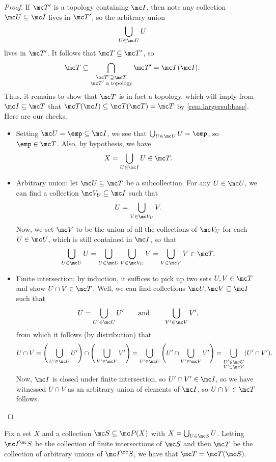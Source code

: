 \documentclass[../notes.tex]{subfiles}
\begin{document}
\begin{proof}
	If $\mc T'$ is a topology containing $\mc I$, then note any collection $\mc U\subseteq\mc I$ lives in $\mc T'$, so the arbitrary union
	\[\bigcup_{U\in\mc U}U\]
	lives in $\mc T'$. It follows that $\mc T\subseteq\mc T'$, so
	\[\mc T\subseteq\bigcap_{\substack{\mc T'\supseteq\mc T\\\mc T'\text{ a topology}}}\mc T'=\mc T(\mc I).\]
	Thus, it remains to show that $\mc T$ is in fact a topology, which will imply from $\mc I\subseteq\mc T$ that $\mc T(\mc I)\subseteq\mc T(\mc T)=\mc T$ by \autoref{rem:largersubbase}. Here are our checks.
	\begin{itemize}
		\item Setting $\mc U=\emp\subseteq\mc I$, we see that $\bigcup_{U\in\mc U}U=\emp$, so $\emp\in\mc T$. Also, by hypothesis, we have
		\[X=\bigcup_{U\in\mc I}U\in\mc T.\]
		\item Arbitrary union: let $\mc U\subseteq\mc T$ be a subcollection. For any $U\in\mc U$, we can find a collection $\mc V_U\subseteq\mc I$ such that
		\[U=\bigcup_{V\in\mc V_U}V.\]
		Now, we set $\mc V$ to be the union of all the collections of $\mc V_U$ for each $U\in\mc U$, which is still contained in $\mc I$, so that
		\[\bigcup_{U\in\mc U}U=\bigcup_{U\in\mc U}\bigcup_{V\in\mc V_U}V=\bigcup_{V\in\mc V}V\in\mc T.\]
		\item Finite intersection: by induction, it suffices to pick up two sets $U,V\in\mc T$ and show $U\cap V\in\mc T$. Well, we can find collections $\mc U,\mc V\subseteq\mc I$ such that
		\[U=\bigcup_{U'\in\mc U}U'\qquad\text{and}\qquad\bigcup_{V'\in\mc V}V',\]
		from which it follows (by distribution) that
		\[U\cap V=\Bigg(\bigcup_{U'\in\mc U}U'\Bigg)\cap\Bigg(\bigcup_{V'\in\mc V}V'\Bigg)=\bigcup_{U'\in\mc U}\Bigg(U'\cap\bigcup_{V'\in\mc V}V'\Bigg)=\bigcup_{\substack{U'\in\mc U\\V'\in\mc V}}(U'\cap V').\]
		Now, $\mc I$ is closed under finite intersection, so $U'\cap V'\in\mc I$, so we have witnessed $U\cap V$ as an arbitrary union of elements of $\mc I$, so $U\cap V\in\mc T$ follows.
		\qedhere
	\end{itemize}
\end{proof}
\begin{corollary}
	Fix a set $X$ and a collection $\mc S\subseteq\mc P(X)$ with $X=\bigcup_{U\in\mc S}U$. Letting $\mc I^\mc S$ be the collection of finite intersections of $\mc S$ and then $\mc T$ be the collection of arbitrary unions of $\mc I^\mc S$, we have that $\mc T=\mc T(\mc S)$.
\end{corollary}
\end{document}
